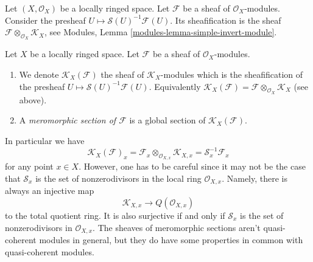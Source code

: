 \noindent
Let $(X, \mathcal{O}_X)$ be a locally ringed space.
Let $\mathcal{F}$ be a sheaf of $\mathcal{O}_X$-modules.
Consider the presheaf $U \mapsto \mathcal{S}(U)^{-1}\mathcal{F}(U)$.
Its sheafification is the sheaf
$\mathcal{F} \otimes_{\mathcal{O}_X} \mathcal{K}_X$, see
Modules, Lemma \ref{modules-lemma-simple-invert-module}.

\begin{definition}
\label{definition-meromorphic-section}
Let $X$ be a locally ringed space.
Let $\mathcal{F}$ be a sheaf of $\mathcal{O}_X$-modules.
\begin{enumerate}
\item We denote
$\mathcal{K}_X(\mathcal{F})$
the sheaf of $\mathcal{K}_X$-modules which is
the sheafification of the presheaf
$U \mapsto \mathcal{S}(U)^{-1}\mathcal{F}(U)$. Equivalently
$\mathcal{K}_X(\mathcal{F}) =
\mathcal{F} \otimes_{\mathcal{O}_X} \mathcal{K}_X$ (see above).
\item A {\it meromorphic section of $\mathcal{F}$}
is a global section of $\mathcal{K}_X(\mathcal{F})$.
\end{enumerate}
\end{definition}

\noindent
In particular we have
$$
\mathcal{K}_X(\mathcal{F})_x
=
\mathcal{F}_x \otimes_{\mathcal{O}_{X, x}} \mathcal{K}_{X, x}
=
\mathcal{S}_x^{-1}\mathcal{F}_x
$$
for any point $x \in X$. However, one has to be careful since it may
not be the case that $\mathcal{S}_x$ is the set of nonzerodivisors
in the local ring $\mathcal{O}_{X, x}$. Namely, there is always
an injective map
$$
\mathcal{K}_{X, x} \longrightarrow Q(\mathcal{O}_{X, x})
$$
to the total quotient ring. It is also surjective if and only if
$\mathcal{S}_x$ is the set of nonzerodivisors in $\mathcal{O}_{X, x}$.
The sheaves of meromorphic sections aren't quasi-coherent
modules in general, but they do have some properties in common
with quasi-coherent modules.

